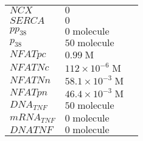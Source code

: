 \documentclass[a4paper,10.0pt]{article}
\begin{document}
{\begin{longtabu}{| l l l |}
  $NCX$\hspace{0.5cm} & $0$\hspace{0.5cm} & \hspace{0.5cm}\\
  $SERCA$\hspace{0.5cm} & $0$\hspace{0.5cm} & \hspace{0.5cm}\\
  $pp_{38}$\hspace{0.5cm} & $0\;\mathrm{molecule}$\hspace{0.5cm} & \hspace{0.5cm}\\
  $p_{38}$\hspace{0.5cm} & $50\;\mathrm{molecule}$\hspace{0.5cm} & \hspace{0.5cm}\\
  $NFATpc$\hspace{0.5cm} & $0.99\;\mathrm{M}$\hspace{0.5cm} & \hspace{0.5cm}\\
  $NFATNc$\hspace{0.5cm} & $112\!\times\!10 ^{-6}\;\mathrm{M}$\hspace{0.5cm} & \hspace{0.5cm}\\
  $NFATNn$\hspace{0.5cm} & $58.1\!\times\!10 ^{-3}\;\mathrm{M}$\hspace{0.5cm} & \hspace{0.5cm}\\
  $NFATpn$\hspace{0.5cm} & $46.4\!\times\!10 ^{-3}\;\mathrm{M}$\hspace{0.5cm} & \hspace{0.5cm}\\
  $DNA_{TNF}$\hspace{0.5cm} & $50\;\mathrm{molecule}$\hspace{0.5cm} & \hspace{0.5cm}\\
  $mRNA_{TNF}$\hspace{0.5cm} & $0\;\mathrm{molecule}$\hspace{0.5cm} & \hspace{0.5cm}\\
  $DNATNF$\hspace{0.5cm} & $0\;\mathrm{molecule}$\hspace{0.5cm} & \hspace{0.5cm}\\

\end{longtabu}}
\end{document}
